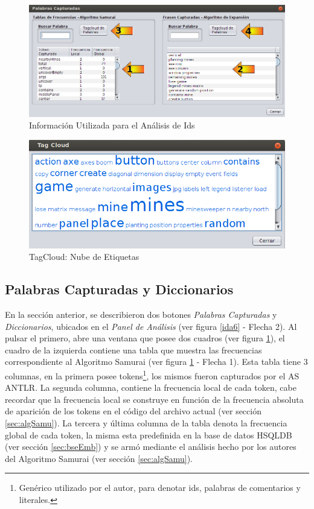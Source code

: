 \begin{figure}[t] %
\centerline{%
\includegraphics[scale= 0.55]{./cap4/ida_07.png}
}
\caption{Información Utilizada para el Análisis de Ids}
\label{ida7}
\end{figure}

\begin{figure}[t] %
\centerline{%
\includegraphics[scale= 0.75]{./cap4/ida_08.png}
}
\caption{TagCloud: Nube de Etiquetas}
\label{ida8}
\end{figure}

\subsection{Palabras Capturadas y Diccionarios}
\label{sec:panPalDicc}

En la sección anterior, se describieron dos botones \textit{Palabras Capturadas} y \textit{Diccionarios}, ubicados en el \textit{Panel de Análisis} (ver figura \ref{ida6} - Flecha 2). Al pulsar el primero, abre una ventana que posee dos cuadros (ver figura \ref{ida7}), el cuadro de la izquierda contiene una tabla que muestra las frecuencias correspondiente al Algoritmo Samurai (ver figura \ref{ida7} - Flecha 1). Esta tabla tiene 3 columnas, en la primera posee tokens\footnote[1]{Genérico utilizado por el autor, para denotar ids, palabras de comentarios y literales.}, los mismos fueron capturados por el AS ANTLR. La segunda columna, contiene la frecuencia local de cada token, cabe recordar que la frecuencia local se construye en función de la frecuencia absoluta de aparición de los tokens en el código del archivo actual (ver sección \ref{sec:algSamu}). La tercera y última columna de la tabla denota la frecuencia global de cada token, la misma esta predefinida en la base de datos HSQLDB (ver sección \ref{sec:bseEmb}) y se armó mediante el análisis hecho por los autores del Algoritmo Samurai (ver sección \ref{sec:algSamu}).

